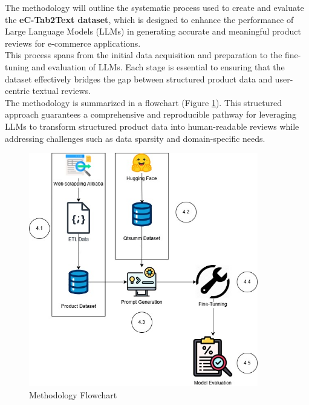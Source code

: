 The methodology will outline the systematic process used to create and evaluate the \textbf{eC-Tab2Text dataset}, which is designed to enhance the performance of Large Language Models (LLMs) in generating accurate and meaningful product reviews for e-commerce applications.
\\

This process spans from the initial data acquisition and preparation to the fine-tuning and evaluation of LLMs. Each stage is essential to ensuring that the dataset effectively bridges the gap between structured product data and user-centric textual reviews.
\\

The methodology is summarized in a flowchart (Figure \ref{fig:MethodologyFlowchart}). This structured approach guarantees a comprehensive and reproducible pathway for leveraging LLMs to transform structured product data into human-readable reviews while addressing challenges such as data sparsity and domain-specific needs.
\begin{figure}[H]
    \centering
    \includegraphics[width=10cm]{images/Methodology.jpg}
    \caption{Methodology Flowchart}
    \label{fig:MethodologyFlowchart}
\end{figure}
